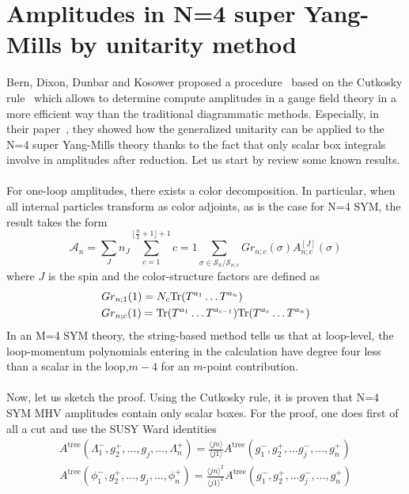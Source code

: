 \section{Amplitudes in N=4 super Yang-Mills by unitarity method}
Bern, Dixon, Dunbar and Kosower proposed a procedure~\cite{Bern:1994zx} based on the Cutkosky rule~\cite{doi:10.1063/1.1703676} which allows to determine compute amplitudes in a gauge field theory in a more efficient way than the traditional diagrammatic methods. 
Especially, in their paper~\cite{Bern:1994zx}, they showed how the generalized unitarity can be applied to the N=4 super Yang-Mills theory thanks to the fact that only scalar box integrals involve in amplitudes after reduction.
Let us start by review some known results.
\\\\
For one-loop amplitudes, there exists a color decomposition. In particular, when all internal particles transform as color adjoints, as is the case for N=4 SYM, the result takes the form
\begin{equation*}
\mathcal{A}_n = \sum_J n_J \sum_{c=1}^{\lfloor \frac{n}{2} + 1 \rfloor + 1}{c=1}\sum_{\sigma\in \mathcal{S}_n/\mathcal{S}_{n;c}} Gr_{n;c}(\sigma) A^{[J]}_{n;c}(\sigma)
\end{equation*}   
where $J$ is the spin and the color-structure factors are defined as
\begin{equation*}
\begin{split}
& Gr_{n;1}(1) = N_c \mathrm{Tr} (T^{a_1}\ldots T^{a_n})
\\
& Gr_{n;c}(1) = \mathrm{Tr} (T^{a_1}\ldots T^{a_{c-1}})\mathrm{Tr}(T^{a_c}\ldots T^{a_n})
\end{split}
\end{equation*}
In an M=4 SYM theory, the string-based method tells us that at loop-level, the loop-momentum polynomials entering in the calculation have degree four less than a scalar in the loop,\ie $m-4$ for an $m$-point contribution.
\\\\
Now, let us sketch the proof.
Using the Cutkosky rule, it is proven that N=4 SYM MHV amplitudes contain only scalar boxes. For the proof, one does first of all a cut and use the SUSY Ward identities
\begin{equation*}
\begin{split}
A^{\mathrm{tree}}(\Lambda_1^-, g_2^+, \ldots, g_j, \ldots, \Lambda_n^+)
= \frac{\langle jn \rangle}{\langle j 1 \rangle}
A^{\mathrm{tree}}(g_1^-, g_2^+, \ldots g_j^-, \ldots , g_n^+)
\\
A^{\mathrm{tree}}(\phi_1^-, g_2^+, \ldots, g_j, \ldots, \phi_n^+)
= \frac{\langle jn \rangle^2}{\langle j 1 \rangle^2}
A^{\mathrm{tree}}(g_1^-, g_2^+, \ldots g_j^-, \ldots , g_n^+)
\end{split}
\end{equation*}
